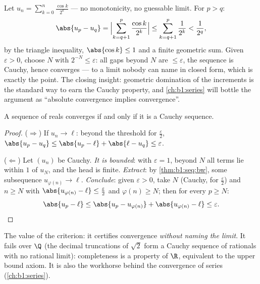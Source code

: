 \begin{example}\label{ex:b1:seq:cauchyhand}
Let $u_n = \sum_{k=0}^{n} \frac{\cos k}{2^k}$ --- no monotonicity,
no guessable limit. For $p > q$:
\[
\abs{u_p - u_q}
= \Bigl| \sum_{k=q+1}^{p} \frac{\cos k}{2^k} \Bigr|
\leq \sum_{k=q+1}^{p} \frac{1}{2^k}
< \frac{1}{2^{q}} ,
\]
by the triangle inequality, $\abs{\cos k} \leq 1$ and a finite
geometric sum. Given $\varepsilon > 0$, choose $N$ with $2^{-N}
\leq \varepsilon$: all gaps beyond $N$ are $\leq \varepsilon$,
the sequence is Cauchy, hence converges --- to a limit nobody
can name in closed form, which is exactly the point. The closing
insight: geometric domination of the increments is the standard
way to earn the Cauchy property, and \cref{ch:b1:series} will
bottle the argument as ``absolute convergence implies
convergence''.
\end{example}

\begin{theorem}[Completeness of $\R$]\label{thm:b1:seq:complete}
A sequence of reals converges if and only if it is a Cauchy
sequence.
\end{theorem}

\begin{proof}
($\Rightarrow$) If $u_n \to \ell$: beyond the threshold for
$\frac\varepsilon2$, $\abs{u_p - u_q} \leq \abs{u_p - \ell} +
\abs{\ell - u_q} \leq \varepsilon$.

($\Leftarrow$) Let $(u_n)$ be Cauchy. \emph{It is bounded}: with
$\varepsilon = 1$, beyond $N$ all terms lie within $1$ of $u_N$, and
the head is finite. \emph{Extract}: by
\cref{thm:b1:seq:bw}, some subsequence $u_{\varphi(n)} \to \ell$.
\emph{Conclude}: given $\varepsilon > 0$, take $N$ (Cauchy, for
$\frac\varepsilon2$) and $n \geq N$ with $\abs{u_{\varphi(n)} - \ell}
\leq \frac\varepsilon2$ and $\varphi(n) \geq N$; then for every $p
\geq N$:
\[
\abs{u_p - \ell} \leq \abs{u_p - u_{\varphi(n)}} +
\abs{u_{\varphi(n)} - \ell} \leq \varepsilon . \qedhere
\]
\end{proof}

\begin{remark}
The value of the criterion: it certifies convergence \emph{without
naming the limit}. It fails over $\Q$ (the decimal truncations of
$\sqrt 2$ form a Cauchy sequence of rationals with no rational
limit): completeness is a property of $\R$, equivalent to the upper
bound axiom. It is also the workhorse behind the convergence of
series (\cref{ch:b1:series}).
\end{remark}

